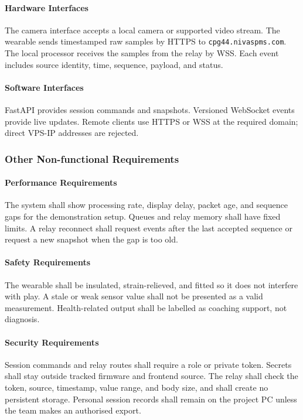 \paragraph{Hardware Interfaces}
The camera interface accepts a local camera or supported video stream. The
wearable sends timestamped raw samples by HTTPS to
\texttt{cpg44.nivaspms.com}. The local processor receives the samples from the
relay by WSS. Each event includes source identity, time, sequence, payload, and
status.

\paragraph{Software Interfaces}
FastAPI provides session commands and snapshots. Versioned WebSocket events
provide live updates. Remote clients use HTTPS or WSS at the required domain;
direct VPS-IP addresses are rejected.

\subsubsection{Other Non-functional Requirements}

\paragraph{Performance Requirements}
The system shall show processing rate, display delay, packet age, and sequence
gaps for the demonstration setup. Queues and relay memory shall have fixed
limits. A relay reconnect shall request events after the last accepted sequence
or request a new snapshot when the gap is too old.

\paragraph{Safety Requirements}
The wearable shall be insulated, strain-relieved, and fitted so it does not
interfere with play. A stale or weak sensor value shall not be presented as a
valid measurement. Health-related output shall be labelled as coaching support,
not diagnosis.

\paragraph{Security Requirements}
Session commands and relay routes shall require a role or private token. Secrets
shall stay outside tracked firmware and frontend source. The relay shall check
the token, source, timestamp, value range, and body size, and shall create no
persistent storage. Personal
session records shall remain on the project PC unless the team makes an
authorised export.

